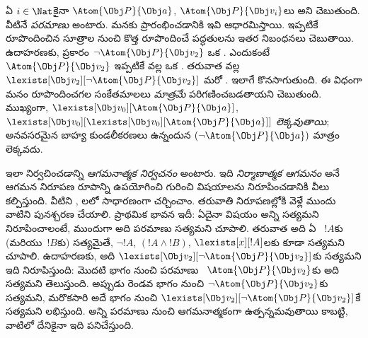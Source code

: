 \documentclass[../../../include/open-logic-section]{subfiles}
\begin{document}
ఏ $i \in \Nat$కైనా $\Atom{\Obj P}{\Obj a}$,
$\Atom{\Obj P}{\Obj v_i}$లు  అని 
చెబుతుంది. వీటినే \emph{పరమాణు}  అంటారు. మనకు
ప్రారంభించడానికి ఇవి ఆధారమిస్తాయి. ఇప్పటికే రూపొందించిన
సూత్రాల నుంచి కొత్త  రూపొందించే పద్ధతులను ఇతర
నిబంధనలు చెబుతాయి. ఉదాహరణకు,  ప్రకారం $\lnot
\Atom{\Obj P}{\Obj v_2}$ ఒక . ఎందుకంటే
$\Atom{\Obj P}{\Obj v_2}$ ఇప్పటికే  వల్ల ఒక
. తరువాత  వల్ల
$\lexists[\Obj v_2][\lnot \Atom{\Obj P}{\Obj v_2}]$ మరో
. ఇలాగే కొనసాగుతుంది. ఈ విధంగా మనం రూపొందించగల
సంకేతమాలలు \emph{మాత్రమే}  పరిగణించబడతాయని
 చెబుతుంది. ముఖ్యంగా,
$\lexists[\Obj v_0][\Atom{\Obj P}{\Obj a}]$,
$\lexists[\Obj v_0][\lexists[\Obj v_0][\Atom{\Obj P}{\Obj a}]]$
 \emph{లెక్కవుతాయి}; అనవసరమైన బాహ్య కుండలీకరణలు ఉన్నందున
$(\lnot \Atom{\Obj P}{\Obj a})$ మాత్రం లెక్కవదు.

 ఇలా నిర్వచించడాన్ని \emph{ఆగమనాత్మక నిర్వచనం}
అంటారు. ఇది \emph{నిర్మాణాత్మక ఆగమనం} అనే ఆగమన నిరూపణ రూపాన్ని
ఉపయోగించి  గురించి విషయాలను నిరూపించడానికి వీలు
కల్పిస్తుంది. వీటిని ,
లలో సాధారణంగా చర్చించాం. తరువాతి
నిరూపణల్లోకి వెళ్లే ముందు వాటిని పునశ్చరణ చేయాలి. ప్రాథమిక భావన ఇదీ:
ఏదైనా విషయం అన్ని  సత్యమని నిరూపించాలంటే, ముందుగా అది
పరమాణు  సత్యమని చూపాలి. తరువాత అది ఏ
~$!A$కు (మరియు~$!B$కు) సత్యమైతే, $\lnot !A$,
$(!A \land !B)$, $\lexists[x][!A]$లకు కూడా సత్యమని చూపాలి.
ఉదాహరణకు, అది $\lexists[\Obj v_2][\lnot \Atom{\Obj P}{\Obj
v_2}]$కు సత్యమని ఇది నిరూపిస్తుంది: మొదటి భాగం నుంచి పరమాణు
~$\Atom{\Obj P}{\Obj v_2}$కు అది సత్యమని తెలుస్తుంది.
అప్పుడు రెండవ భాగం నుంచి $\lnot \Atom{\Obj P}{\Obj v_2}$కు సత్యమని,
మరొకసారి అదే భాగం నుంచి $\lexists[\Obj v_2][\lnot \Atom{\Obj
P}{\Obj v_2}]$కే సత్యమని లభిస్తుంది. అన్ని  పరమాణు
 నుంచి ఆగమనాత్మకంగా ఉత్పన్నమవుతాయి కాబట్టి, వాటిలో
దేనికైనా ఇది పనిచేస్తుంది.
\end{document}
